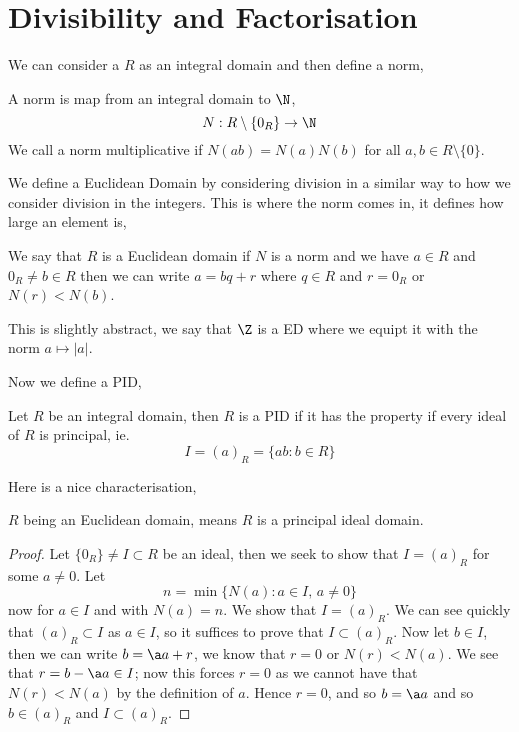 
\section{Divisibility and Factorisation}

We can consider a $R$ as an integral domain and then define a norm,
\begin{ndefi}[Norm]
  A norm is map from an integral domain to $\N$,
  $$ N : R\setminus \{0_R\} \to \N $$
  We call a norm multiplicative if $N(ab) = N(a)N(b)$ for all $a, b \in R\setminus \{0\}$.
\end{ndefi}

\noindent
We define a Euclidean Domain by considering division in a similar way to how we consider division in the integers. This is where the norm comes in, it defines how large an element is,
\begin{ndefi}
  We say that $R$ is a Euclidean domain if $N$ is a norm and we have $a \in R$ and $0_R \ne b \in R$ then we can write $a = bq + r$ where $q \in R$ and $r = 0_R$ or $N(r) < N(b)$.
\end{ndefi}

This is slightly abstract, we say that $\Z$ is a ED where we equipt it with the norm $a \mapsto |a|$.

\noindent
Now we define a PID,
\begin{ndefi}
  Let $R$ be an integral domain, then $R$ is a PID if it has the property if every ideal of $R$ is principal, ie.
  $$ I = (a)_R = \{ab : b \in R\} $$
\end{ndefi}
Here is a nice characterisation,

\begin{nthm}
  $R$ being an Euclidean domain, means $R$ is a principal ideal domain.
\end{nthm}
\begin{proof}
  Let $\{0_R\} \ne I \subset R$ be an ideal, then we seek to show that $I = (a)_R$ for some $a \ne 0$. Let
  $$ n = \min\{N(a) : a \in I,\, a \ne 0\} $$
  now for $a \in I$ and with $N(a) = n$. We show that $I = (a)_R$. We can see quickly that $(a)_R \subset I$ as $a \in I$, so it suffices to prove that $I \subset (a)_R$. Now let $b \in I$, then we can write $b = \a a + r$, we know that $r = 0$ or $N(r) < N(a)$. We see that $r = b - \a a \in I$; now this forces $r = 0$ as we cannot have that $N(r) < N(a)$ by the definition of $a$. Hence $r = 0$, and so $b = \a a$ and so $b \in (a)_R$ and $I \subset (a)_R$.
\end{proof}

